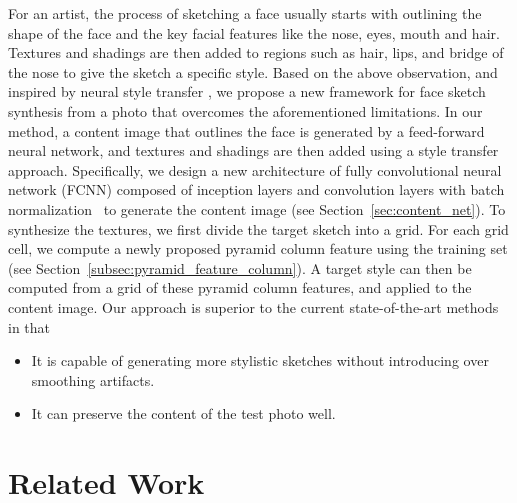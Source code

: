 \documentclass[10pt,twocolumn,letterpaper]{article}
\begin{document}
For an artist, the process of sketching a face usually starts with outlining the shape of the face and the key facial features like the nose, eyes, mouth and hair. Textures and shadings are then added to regions such as hair, lips, and bridge of the nose to give the sketch a specific style. Based on the above observation, and inspired by neural style transfer \cite{gatys2015neural}, we propose a new framework for face sketch synthesis from a  photo that overcomes the aforementioned limitations. In our method, a content image that outlines the face is generated by a feed-forward neural network, and textures and shadings are then added using a style transfer approach. Specifically, we design a new architecture of fully convolutional neural network (FCNN) composed of inception layers \cite{szegedy2015going} and convolution layers with batch normalization~\cite{Sergey2015batch} to generate the content image (see Section~\ref{sec:content_net}). To synthesize the textures, we first divide the target sketch into a grid. For each grid cell, we compute a newly proposed pyramid column feature using the training set (see Section~\ref{subsec:pyramid_feature_column}). A target style can then be computed from a grid of these pyramid column features, and applied to the content image. Our approach is superior to the current state-of-the-art methods in that
\begin{itemize}
\item It is capable of generating more stylistic sketches without introducing over smoothing artifacts.
\item It can preserve the content of the test photo well.
\end{itemize}

\section{Related Work}\label{sec:related_work}
\end{document}
